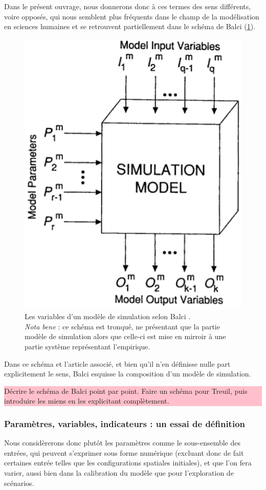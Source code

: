 \documentclass[12pt, a4paper, oneside]{book}
\begin{document}
	Dans le présent ouvrage, nous donnerons donc à ces termes des sens différents, voire opposés, qui nous semblent plus fréquents dans le champ de la modélisation en sciences humaines et se retrouvent partiellement dans le schéma de Balci (\cref{fig:parametres-Balci}).
	\begin{figure}[!h]
		\includegraphics[width=.4\linewidth]{img/Balci1994a_Figure_Parametres.png}
		\caption{Les variables d'un modèle de simulation selon Balci \autocite[122]{balci_validation_1994-2}.\\
		\textit{Nota bene} : ce schéma est tronqué, ne présentant que la partie \og modèle de simulation\fg{} alors que celle-ci est mise en mirroir à une partie \og système\fg{} représentant l'empirique.}
		\label{fig:parametres-Balci} 
	\end{figure}
	
	Dans ce schéma et l'article associé, et bien qu'il n'en définisse nulle part explicitement le sens, Balci esquisse la composition d'un modèle de simulation.
	
	\colorbox{pink}{\parbox{0.9\textwidth}{%
			\vskip5pt
			Décrire le schéma de Balci point par point. Faire un schéma pour Treuil, puis introduire les miens en les explicitant complètement.
			\vskip5pt
		}
	}
	
	
	\subsubsection{Paramètres, variables, indicateurs : un essai de définition}
	\label{subsubsec:mes_definitions_params}
	
	Nous considèrerons donc plutôt les paramètres comme le sous-ensemble des entrées, qui peuvent s'exprimer sous forme numérique (excluant donc de fait certaines entrée telles que les configurations spatiales initiales), et que l'on fera varier, aussi bien dans la calibration du modèle que pour l'exploration de scénarios.
	
\end{document}
